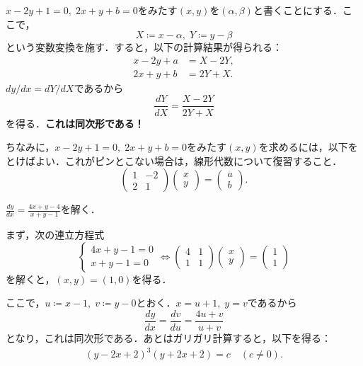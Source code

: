 $x-2y+1=0, \; 2x+y+b=0$をみたす$(x,y)$を$(\alpha,\beta)$と書くことにする．ここで，
\[ X \coloneqq x-\alpha, \; Y \coloneqq y-\beta\]
という変数変換を施す．すると，以下の計算結果が得られる：
\begin{align*}
    x-2y+a &= X-2Y, \\
    2x+y+b &= 2Y+X.
\end{align*}
$dy/dx = dY/dX$であるから
\[ \frac{dY}{dX} = \frac{X-2Y}{2Y+X}\]
を得る．\textbf{これは同次形である！}

ちなみに，$x-2y+1=0, \; 2x+y+b=0$をみたす$(x,y)$を求めるには，以下をとけばよい．これがピンとこない場合は，線形代数について復習すること．
\[ \begin{pmatrix}
    1 & -2 \\ 2 & 1
\end{pmatrix}
\begin{pmatrix}
    x \\ y
\end{pmatrix}
= \begin{pmatrix}
    a \\ b
\end{pmatrix}.\]

\begin{example}
    $\frac{dy}{dx} = \frac{4x+y-4}{x+y-1}$を解く．

    まず，次の連立方程式
    \[ \begin{cases}
        4x+y-1 = 0 \\
        x+y-1 = 0
    \end{cases}
    \iff
    \begin{pmatrix}
        4 & 1 \\
        1 & 1
    \end{pmatrix}
    \begin{pmatrix}
        x \\ y
    \end{pmatrix}
    = 
    \begin{pmatrix}
        1 \\ 1
    \end{pmatrix}\]
    を解くと，$(x,y)=(1,0)$を得る．

    ここで，$u \coloneqq x-1, \; v \coloneqq y-0$とおく．$x=u+1, \; y=v$であるから
    \[ \frac{dy}{dx} = \frac{dv}{du} = \frac{4u+v}{u+v}\]
    となり，これは同次形である．あとはガリガリ計算すると，以下を得る：
    \begin{align*}
        (y-2x+2)^3(y+2x+2) = c \quad (c \neq 0).
    \end{align*}
\end{example}